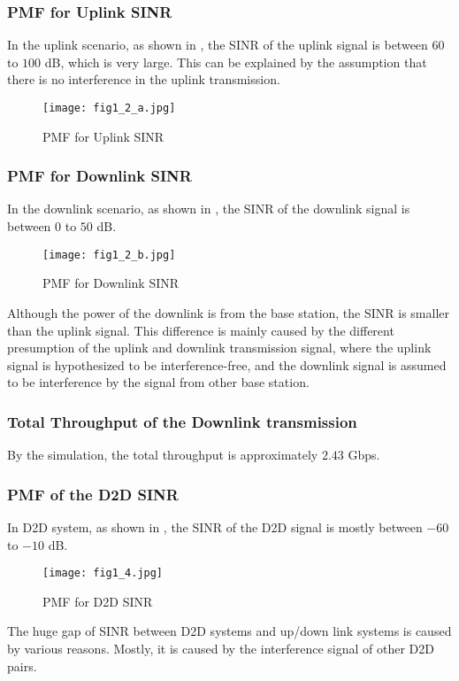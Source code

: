 \documentclass[conference]{IEEEtran}
\begin{document}
\subsubsection{PMF for Uplink SINR}
In the uplink scenario, as shown in , the SINR of the uplink signal is between $60$ to $100$ dB, which is very large. This can be explained by the assumption that there is no interference in the uplink transmission.
\begin{figure}[htbp]
    \centering
    \texttt{[image: fig1\_2\_a.jpg]}
    \caption{PMF for Uplink SINR}
    \label{fig:uplink_sinr}
\end{figure}

\subsubsection{PMF for Downlink SINR}
In the downlink scenario, as shown in , the SINR of the downlink signal is between $0$ to $50$ dB.
\begin{figure}[htbp]
    \centering
    \texttt{[image: fig1\_2\_b.jpg]}
    \caption{PMF for Downlink SINR}
    \label{fig:downlink_sinr}
\end{figure}
Although the power of the downlink is from the base station, the SINR is smaller than the uplink signal. This difference is mainly caused by the different presumption of the uplink and downlink transmission signal, where the uplink signal is hypothesized to be interference-free, and the downlink signal is assumed to be interference by the signal from other base station.
\subsubsection{Total Throughput of the Downlink transmission}
By the simulation, the total throughput is approximately $2.43$ Gbps.
\subsubsection{PMF of the D2D SINR}
In D2D system, as shown in , the SINR of the D2D signal is mostly between $-60$ to $-10$ dB.

\begin{figure}[htbp]
    \centering
    \texttt{[image: fig1\_4.jpg]}
    \caption{PMF for D2D SINR}
    \label{fig:d2d_sinr}
\end{figure}
The huge gap of SINR between D2D systems and up/down link systems is caused by various reasons. Mostly, it is caused by the interference signal of other D2D pairs.
\end{document}
